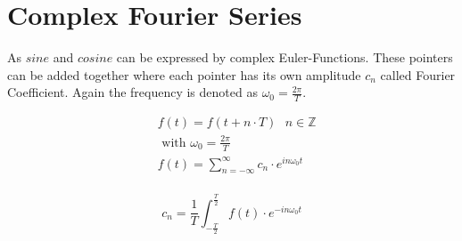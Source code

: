 \documentclass[./\jobname.tex]{subfiles}
\begin{document}
\section{Complex Fourier Series}
As $sine$ and $cosine$ can be expressed by complex Euler-Functions. These pointers can be added together where each pointer has its own amplitude $c_n$ called Fourier Coefficient. Again the frequency is denoted as $\omega_0 = \frac{2 \pi}{T}$. 


\begin{equation}
	\begin{split}
		& f(t) = f(t + n \cdot T) \text{    $n \in \mathbb{Z}$} \\
		& \text{ with } \omega_0 = \frac{2 \pi}{T} \\
		& f(t) = \sum_{n = -\infty}^{\infty} c_n \cdot e^{in\omega_0 t} \\
	\end{split}
\end{equation}


\begin{equation}
	c_n = \frac{1}{T} \int_{-\frac{T}{2}}^{\frac{T}{2}} f(t) \cdot e^{- i n \omega_0 t}
\end{equation}


\begin{table}[H]
	\centering
	\noindent{}
\end{table}
\end{document}
